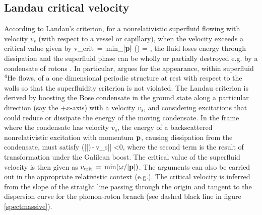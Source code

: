 \subsection{Landau critical velocity}
According to Landau's criterion, for a nonrelativistic superfluid flowing with velocity $v_s$ (with respect to a vessel or capillary), when the velocity exceeds a critical value \cite{Schmitt:2014eka} given by 
\be
v_{\rm crit} \,=\, {\rm min}_{|\bf p|} \left(\frac{\omega(\p)}{|\p|}\right)\,\implies \frac{\partial \omega}{\partial |\p|}\,=\,\frac{\omega}{|\p|}\,,
\ee
the fluid loses energy through dissipation and the superfluid phase can be wholly or partially destroyed e.g. by a condensate of rotons \cite{pitaevskii84, voskresenskii93}. In particular, \cite{pitaevskii84} argues for the appearance, within superfluid ${}^4{\rm He}$ flows, of a one dimensional periodic structure at rest with  respect to the walls so that the superfluidity criterion is not violated. The Landau criterion is derived by boosting the Bose condensate in the ground state along a particular direction (say the $+x$-axis) with a velocity $v_s$, and considering excitations that could reduce or dissipate the energy of the moving condensate. In the frame where the condensate has velocity $v_s$, the energy of a backscattered nonrelativistic excitation with momentum ${\bf p}$, causing dissipation  from the condensate, must  satisfy
\be
\omega(|\p|)\,-\,v_s|\p| <0,
\ee
where the second term is the result of  transformation under  the Galilean boost.
The critical value of the superfluid velocity is then given as $v_{\rm crit}\,=\,{\rm min}(\omega/|{\bf p}|)$. The arguments can also be carried out in the appropriate relativistic context (e.g.\cite{voskresenskii93, Schmitt:2014eka}). The critical velocity is inferred from the slope of the straight line passing through the origin and tangent to the dispersion curve for the phonon-roton branch (see dashed black line in figure \ref{spectmassive}).

